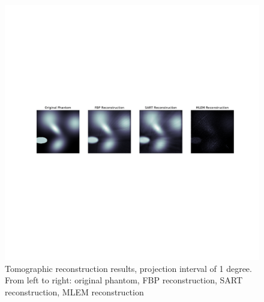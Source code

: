 \begin{figure}[t]
    \centering
    \includegraphics[clip, trim=4cm 15cm 3cm 14cm,
    width=\textwidth]{img/pdf/rec_compilation_1.pdf}
    \caption{Tomographic reconstruction results, projection interval of
    1 degree. From left to right: original phantom, FBP reconstruction,
    SART reconstruction, MLEM reconstruction}
    \label{fig:rec_results}
\end{figure}

